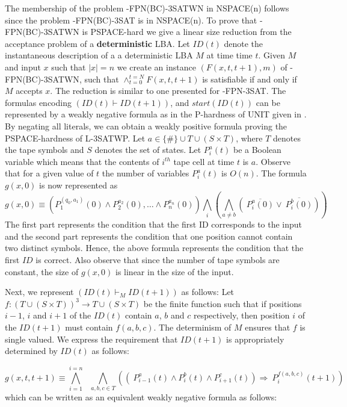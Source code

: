 The membership of the problem {-FPN(BC)-3SATWN} in {\sf NSPACE(n)} 
follows since the problem {-FPN(BC)-3SAT} is in {\sf NSPACE(n)}.  
To prove that {-FPN(BC)-3SATWN} is {\sf PSPACE}-hard we give a linear size
reduction from the acceptance problem of a {\bf deterministic} {\sf LBA}.
Let $ID(t)$ denote the  instantaneous description of a
a deterministic {\sf LBA} $M$ at time time $t$.
Given $M$ and input $x$ such that $|x| = n$ we create
an instance $(F(x,t,t+1),m)$ of {-FPN(BC)-3SATWN}, such that 
$\wedge_{t = 0}^{t = N} F(x, t, t+1)$ is 
satisfiable if and only if $M$ accepts $x$. 
The reduction is similar to one presented for  {-FPN-3SAT}. 
The formulas encoding $(ID(t) \vdash ID(t+1))$, and $start(ID(t))$
can  be represented by a weakly negative formula
as in the {\sf P}-hardness of {\sf UNIT} given in \cite{JL77}. 
By negating all literals, we can 
obtain a weakly positive formula proving the {\sf PSPACE}-hardness of 
{\sf L-3SATWP}. Let $a \in \{ \# \} \cup T \cup  (S \times T)$, where 
$T$ denotes the tape symbols and $S$ denotes the set of states. 
Let $P^a_i(t)$ be a Boolean variable which means that the contents
of $i^{th}$ tape cell at time $t$ is $a$. Observe that for a given value of $t$
the number of variables $P^a_i(t)$ is $O(n)$. 
The formula $g(x,0)$ is now represented as
\[g(x, 0) \equiv 
\left( P_{1}^{(q_0,a_1)}(0) \wedge P_{2}^{a_2}(0),\ldots \wedge 
P_{n}^{a_n}(0) \right) \bigwedge_{i} \left(\bigwedge_{a \neq b} 
(~\overline{P_{i}^a(0)} \vee  ~\overline{P_{i}^b(0)}) \right)\]
The first part represents the condition that the first ID corresponds to the
input and the second part represents the condition that one position
cannot contain two distinct symbols. Hence, the above formula represents the
condition that the first $ID$ is correct.  Also observe that since the number 
of tape symbols are constant, the size of $g(x,0)$ is linear in the size of 
the input.

Next, we represent  $(ID(t) {\vdash}_M ID(t+1))$
as follows:
Let $f:(T \cup (S \times T))^3 \rightarrow T \cup (S \times T)$ be the finite
function such that if positions $i-1$, $i$ and $i+1$ of the $ID(t)$ 
contain $a$, $b$ and $c$ respectively, then position $i$ of the $ID(t+1)$ 
must contain $f(a,b,c)$. The determinism of $M$ ensures that
$f$ is single valued. We express the requirement that $ID(t+1)$ 
is appropriately  determined by $ID(t)$ as follows:


\[g(x, t,t+1) \equiv  \bigwedge_{i =1}^{ i = n} ~~~ \bigwedge_{a,b,c \in T} 
\left(\left(~P_{i-1}^{a}(t) \wedge P_{i}^{b}(t) \wedge 
P_{i+1}^{c}(t) \right) \Rightarrow ~P_{i}^{f(a,b,c)}(t+1) \right) \]
which can be written as an equivalent weakly negative formula as follows:

